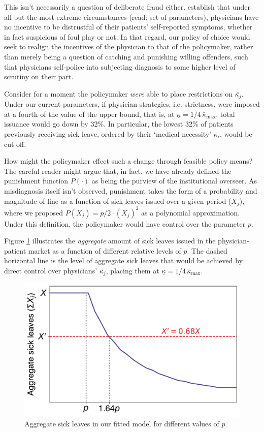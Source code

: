 \documentclass[../main.tex]{subfiles}
\begin{document}
This isn't necessarily a question of deliberate fraud either. \cite{cln} establish that under all but the most extreme circumstances (read: set of parameters), physicians have no incentive to be distrustful of their patients' self-reported symptoms, whether in fact suspicious of foul play or not. In that regard, our policy of choice would seek to realign the incentives of the physician to that of the policymaker, rather than merely being a question of catching and punishing willing offenders, such that physicians self-police into subjecting diagnosis to some higher level of scrutiny on their part.

Consider for a moment the policymaker \textit{were} able to place restrictions on $\bar{\kappa_j}$. Under our current parameters, if physician strategies, i.e. strictness, were imposed at a fourth of the value of the upper bound, that is, at $\underline{\kappa} = 1/4 \, \bar{\kappa}_{\max}$, total issuance would go down by 32\%. In particular, the lowest 32\% of patients previously receiving sick leave, ordered by their `medical necessity' $\kappa_i$, would be cut off.

How might the policymaker effect such a change through feasible policy means? The careful reader might argue that, in fact, we have already defined the punishment function $P(\cdot)$ as being the purview of the institutional overseer. As misdiagnosis itself isn't observed, punishment takes the form of a probability and magnitude of fine as a function of sick leaves issued over a given period ($X_j$), where we proposed $P(X_j) = p / 2 \cdot (X_j)^2$ as a polynomial approximation. Under this definition, the policymaker would have control over the parameter $p$.

Figure \ref{fig:counter} illustrates the \textit{aggregate} amount of sick leaves issued in the physician-patient market as a function of different relative levels of $p$. The dashed horizontal line is the level of aggregate sick leaves that would be achieved by direct control over physicians' $\bar{\kappa_j}$, placing them at $\underline{\kappa} = 1/4 \, \bar{\kappa}_{\max}$.

\begin{figure}[H]
    \centering
    \includegraphics[width=0.60\linewidth]{counter.pdf}
    \captionsetup{justification=centerlast}
    \caption{Aggregate sick leaves in our fitted model for different values of $p$}
    \label{fig:counter}
\end{figure}
\end{document}
